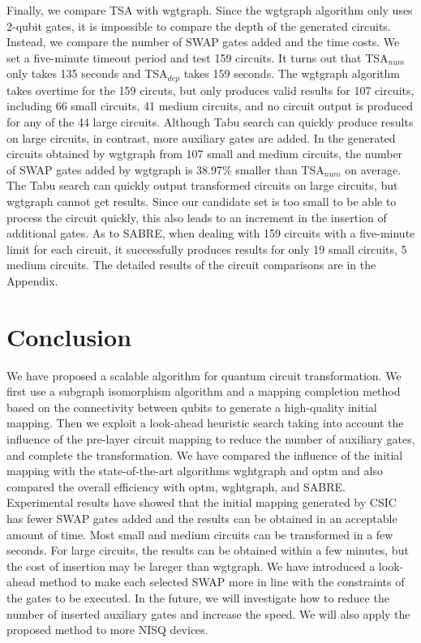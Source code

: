 \documentclass[journal]{IEEEtran}
\begin{document}
Finally, we compare TSA with wgtgraph.  Since the wgtgraph algorithm only uses 2-qubit gates, it is impossible to compare the depth of the generated circuits.  Instead, we compare the number of SWAP gates added and the time costs. 
  We set a five-minute timeout period and test 159 circuits. It turns out that TSA$_{num}$ only takes 135 seconds and TSA$_{dep}$ takes 159 seconds. The  wgtgraph algorithm takes overtime for the 159 circuts,  but only produces valid results for 107 circuits, including 66 small circuits,  41 medium circuits,  and no circuit output is produced for any of the 44 large circuits. Although Tabu search can quickly produce results on large circuits, in contrast,  more auxiliary gates are added.  In the generated circuits obtained by wgtgraph from 107 small and medium circuits,  the number of SWAP gates added by wgtgraph is 38.97\%  smaller than TSA$_{num}$ on average. The Tabu search can quickly output transformed circuits on large circuits, but wgtgraph cannot get results. Since  our candidate set is too small to be able to process the circuit quickly,  this also leads to an increment in the insertion of additional gates. As to SABRE, when dealing with 159 circuits with a five-minute limit for each circuit, it successfully produces results for only 19 small circuits, 5 medium circuits. The detailed results of the circuit comparisons are in the Appendix. 
  
  \section{Conclusion}
  \label{Conclusion}
  We have proposed a scalable algorithm for quantum circuit transformation. We first use a subgraph isomorphism algorithm and a mapping completion method based on the connectivity between qubits to generate a high-quality initial mapping. Then we exploit a look-ahead heuristic search taking into account the influence of the pre-layer circuit mapping to reduce the number of auxiliary gates, and complete the transformation. We have compared the influence of the initial mapping  with the state-of-the-art algorithms wghtgraph and optm and also compared the overall efficiency with optm, wghtgraph, and SABRE.
  Experimental results have showed that the initial mapping generated by CSIC has fewer SWAP gates added and the results can be obtained in an acceptable amount of time. Most small and medium circuits can be transformed in a few seconds.
  For large circuits, the results can be obtained within a few minutes,
  but the cost of insertion may be lareger than wgtgraph.
  We have introduced a look-ahead method to make each selected SWAP more in line with the constraints of the gates to be executed.
  In the future, we will investigate how to reduce the number of inserted auxiliary gates  and increase the speed. We will also apply the proposed method to more NISQ devices.
\end{document}
